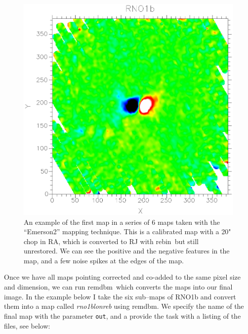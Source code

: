 \documentclass[twoside,11pt]{article}
\newcommand{\task}[1]{\textsf{#1}}
\newcommand{\rebin}{\xref{\task{rebin}}{sun216}{REBIN}}
\newcommand{\remdbm}{\xref{\task{remdbm}}{sun216}{REMDBM}}
\newcommand{\xref}[3]{#1}
\renewcommand{\_}{\texttt{\symbol{95}}}
\begin{document}
\begin{figure}
\begin{center}
\includegraphics[width=\textwidth]{sc11_fig9.eps}
\caption{An example of the first map in a series of 6 maps taken
with the ``Emerson2'' mapping technique. This is a calibrated map
with a 20" chop in RA, which is converted to RJ with \rebin\, but
still unrestored. We can see the positive and the negative features
in the map, and a few noise spikes at the edges of the map. }
\label{fig:dual}
\end{center}
\end{figure}


Once we have all maps pointing corrected and co-added to the same
pixel size and dimension, we can run \remdbm\, which converts the maps
into our final image.  In the example below I take the six sub--maps
of RNO1b and convert them into a map called {\it rno1b\_lon\_reb}
using \remdbm.  We specify the name of the final map with the parameter
\texttt{out}, and a provide the task with a listing of the files, see
below:
\end{document}
